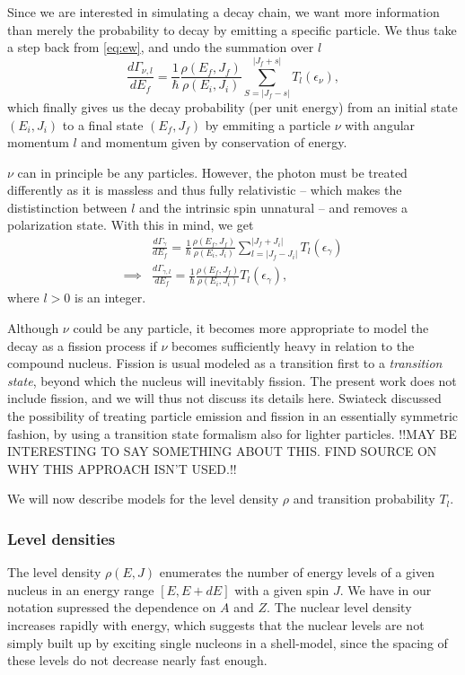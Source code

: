 Since we are interested in simulating a decay chain, we want more information than merely the probability to decay by emitting a specific particle. We thus take a step back from \eqref{eq:ew}, and undo the summation over $l$
\begin{equation}
\frac{d\Gamma_{\nu,l}}{dE_f} = \frac{1}{\hbar} \frac{\rho(E_f,J_f)}{\rho(E_i,J_i)} \sum_{S=|J_f-s|}^{|J_f+s|} T_l(\epsilon_\nu),\label{eq:ew}
\end{equation}
which finally gives us the decay probability (per unit energy) from an initial state $(E_i,J_i)$ to a final state $(E_f,J_f)$ by emmiting a particle $\nu$ with angular momentum $l$ and momentum given by conservation of energy.

$\nu$ can in principle be any particles. However, the photon must be treated differently as it is massless and thus fully relativistic -- which makes the dististinction between $l$ and the intrinsic spin unnatural -- and removes a polarization state. With this in mind, we get
\begin{align}
&\frac{d\Gamma_{\gamma}}{dE_f} = \frac{1}{\hbar} \frac{\rho(E_f,J_f)}{\rho(E_i,J_i)} \sum_{l=|J_f-J_i|}^{|J_f+J_i|} T_l(\epsilon_\gamma) \\
\implies & \frac{d\Gamma_{\gamma,l}}{dE_f} = \frac{1}{\hbar} \frac{\rho(E_f,J_f)}{\rho(E_i,J_i)} T_l(\epsilon_\gamma),\label{eq:gammagamma}
\end{align}
where $l>0$ is an integer.

Although $\nu$ could be any particle, it becomes more appropriate to model the decay as a fission process if $\nu$ becomes sufficiently heavy in relation to the compound nucleus. Fission is usual modeled as a transition first to a \emph{transition state}, beyond which the nucleus will inevitably fission\cite{krane:book}. The present work does not include fission, and we will thus not discuss its details here. Swiateck discussed the possibility of treating particle emission and fission in an essentially symmetric fashion, by using a transition state formalism also for lighter particles\cite{swiatecki:1983:art}. !!MAY BE INTERESTING TO SAY SOMETHING ABOUT THIS. FIND SOURCE ON WHY THIS APPROACH ISN'T USED.!!

We will now describe models for the level density $\rho$ and transition probability $T_l$.

\subsubsection{Level densities}
The level density $\rho(E,J)$ enumerates the number of energy levels of a given nucleus in an energy range $[E,E+dE]$ with a given spin $J$. We have in our notation supressed the dependence on $A$ and $Z$. The nuclear level density increases rapidly with energy, which suggests that the nuclear levels are not simply built up by exciting single nucleons in a shell-model, since the spacing of these levels do not decrease nearly fast enough.

